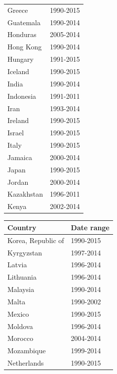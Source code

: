 \documentclass[12pt,a4paper]{article}
\begin{document}
\begin{table}[htbp]
\begin{subtable}{0.45\textwidth}
\begin{tabular}{ll}
                    Greece &  1990-2015 \\
                 Guatemala &  1990-2014 \\
                  Honduras &  2005-2014 \\
                 Hong Kong &  1990-2014 \\
                   Hungary &  1991-2015 \\
                   Iceland &  1990-2015 \\
                     India &  1990-2014 \\
                 Indonesia &  1991-2011 \\
					  Iran &  1993-2014 \\
                   Ireland &  1990-2015 \\
                    Israel &  1990-2015 \\
                     Italy &  1990-2015 \\
                   Jamaica &  2000-2014 \\
                     Japan &  1990-2015 \\
                    Jordan &  2000-2014 \\
                Kazakhstan &  1996-2011 \\
                     Kenya &  2002-2014 \\
\bottomrule
\end{tabular}
\end{subtable}
\begin{subtable}{0.45\textwidth}
\centering
\begin{tabular}{ll}
\toprule
        Country & Date range \\
\midrule
        Korea, Republic of &  1990-2015 \\
                Kyrgyzstan &  1997-2014 \\
                    Latvia &  1996-2014 \\
                 Lithuania &  1996-2014 \\
                  Malaysia &  1990-2014 \\
                     Malta &  1990-2002 \\
                    Mexico &  1990-2015 \\
                   Moldova &  1996-2014 \\
                   Morocco &  2004-2014 \\
                Mozambique &  1999-2014 \\
               Netherlands &  1990-2015 \\

\end{tabular}
\end{subtable}
\end{table}
\end{document}
